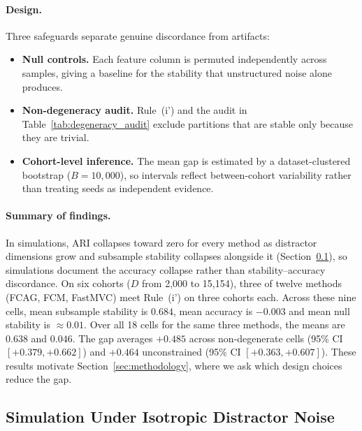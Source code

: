 \documentclass[pdflatex,sn-mathphys-num]{sn-jnl}
\theoremstyle{thmstyleone}
\theoremstyle{thmstyletwo}
\theoremstyle{thmstylethree}
\begin{document}
\paragraph{Design.}
Three safeguards separate genuine discordance from artifacts:
\begin{itemize}
    \item \textbf{Null controls.} Each feature column is permuted independently across samples, giving a baseline for the stability that unstructured noise alone produces.
    \item \textbf{Non-degeneracy audit.} Rule~(i') and the audit in Table~\ref{tab:degeneracy_audit} exclude partitions that are stable only because they are trivial.
    \item \textbf{Cohort-level inference.} The mean gap is estimated by a dataset-clustered bootstrap ($B = 10{,}000$), so intervals reflect between-cohort variability rather than treating seeds as independent evidence.
\end{itemize}

\paragraph{Summary of findings.}
In simulations, ARI collapses toward zero for every method as distractor dimensions grow and subsample stability collapses alongside it (Section~\ref{sec:sim_isotropic}), so simulations document the accuracy collapse rather than stability--accuracy discordance. On six cohorts ($D$ from 2,000 to 15,154), three of twelve methods (FCAG, FCM, FastMVC) meet Rule~(i') on three cohorts each. Across these nine cells, mean subsample stability is $0.684$, mean accuracy is $-0.003$ and mean null stability is $\approx 0.01$. Over all 18 cells for the same three methods, the means are $0.638$ and $0.046$. The gap averages $+0.485$ across non-degenerate cells (95\% CI $[+0.379, +0.662]$) and $+0.464$ unconstrained (95\% CI $[+0.363, +0.607]$). These results motivate Section~\ref{sec:methodology}, where we ask which design choices reduce the gap.

\subsection{Simulation Under Isotropic Distractor Noise}\label{sec:sim_isotropic}
\end{document}
